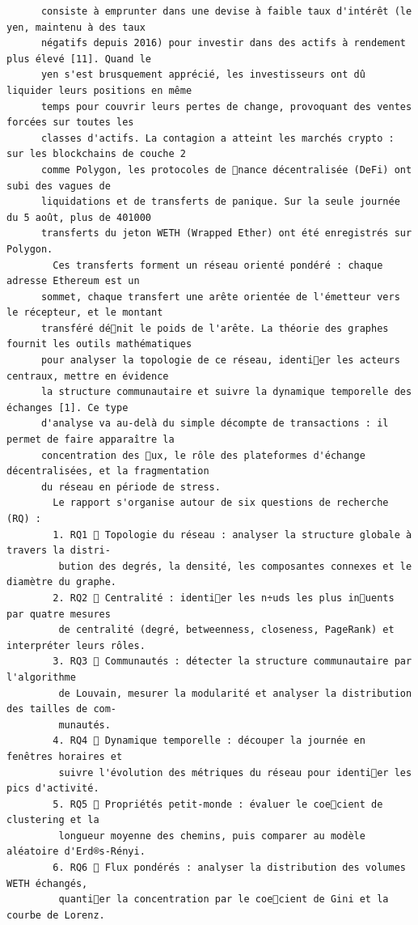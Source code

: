 \documentclass[12pt]{article}
\begin{document}
\begin{verbatim}
      consiste à emprunter dans une devise à faible taux d'intérêt (le yen, maintenu à des taux
      négatifs depuis 2016) pour investir dans des actifs à rendement plus élevé [11]. Quand le
      yen s'est brusquement apprécié, les investisseurs ont dû liquider leurs positions en même
      temps pour couvrir leurs pertes de change, provoquant des ventes forcées sur toutes les
      classes d'actifs. La contagion a atteint les marchés crypto : sur les blockchains de couche 2
      comme Polygon, les protocoles de nance décentralisée (DeFi) ont subi des vagues de
      liquidations et de transferts de panique. Sur la seule journée du 5 août, plus de 401000
      transferts du jeton WETH (Wrapped Ether) ont été enregistrés sur Polygon.
        Ces transferts forment un réseau orienté pondéré : chaque adresse Ethereum est un
      sommet, chaque transfert une arête orientée de l'émetteur vers le récepteur, et le montant
      transféré dénit le poids de l'arête. La théorie des graphes fournit les outils mathématiques
      pour analyser la topologie de ce réseau, identier les acteurs centraux, mettre en évidence
      la structure communautaire et suivre la dynamique temporelle des échanges [1]. Ce type
      d'analyse va au-delà du simple décompte de transactions : il permet de faire apparaître la
      concentration des ux, le rôle des plateformes d'échange décentralisées, et la fragmentation
      du réseau en période de stress.
        Le rapport s'organise autour de six questions de recherche (RQ) :
        1. RQ1  Topologie du réseau : analyser la structure globale à travers la distri-
         bution des degrés, la densité, les composantes connexes et le diamètre du graphe.
        2. RQ2  Centralité : identier les n÷uds les plus inuents par quatre mesures
         de centralité (degré, betweenness, closeness, PageRank) et interpréter leurs rôles.
        3. RQ3  Communautés : détecter la structure communautaire par l'algorithme
         de Louvain, mesurer la modularité et analyser la distribution des tailles de com-
         munautés.
        4. RQ4  Dynamique temporelle : découper la journée en fenêtres horaires et
         suivre l'évolution des métriques du réseau pour identier les pics d'activité.
        5. RQ5  Propriétés petit-monde : évaluer le coecient de clustering et la
         longueur moyenne des chemins, puis comparer au modèle aléatoire d'Erd®s-Rényi.
        6. RQ6  Flux pondérés : analyser la distribution des volumes WETH échangés,
         quantier la concentration par le coecient de Gini et la courbe de Lorenz.

\end{verbatim}
\end{document}
